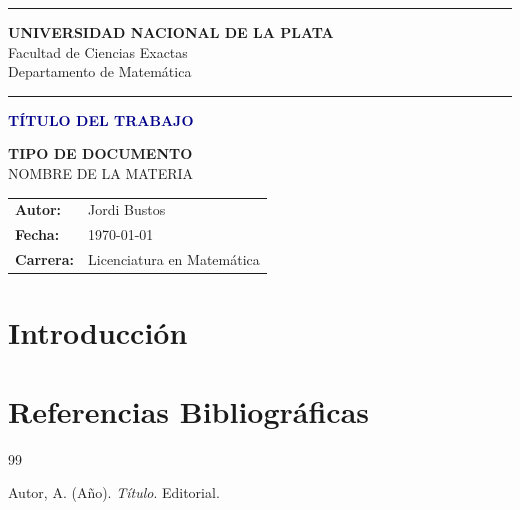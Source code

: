 \documentclass[12pt,a4paper]{article}
\theoremstyle{profesional}
\theoremstyle{definicion-style}
\begin{document}
\thispagestyle{empty}
\begin{center}
    \vspace*{1cm}

    \textcolor{darkblue}{\rule{\linewidth}{2pt}}

    \vspace{0.5cm}
    {\large \textbf{UNIVERSIDAD NACIONAL DE LA PLATA}}\\
    {\normalsize Facultad de Ciencias Exactas}\\
    {\normalsize Departamento de Matemática}\\

    \vspace{0.5cm}
    \textcolor{darkblue}{\rule{\linewidth}{2pt}}

    \vspace{2.5cm}

    {\Huge \textbf{\textcolor{darkblue}{TÍTULO DEL TRABAJO}}}\\

    \vspace{3cm}

    {\large \textbf{TIPO DE DOCUMENTO}}\\   %
    {\normalsize NOMBRE DE LA MATERIA}

    \vspace{2.5cm}

    {\normalsize
        \begin{tabular}{ll}
            \textbf{Autor:}   & Jordi Bustos               \\
            \textbf{Fecha:}   & \today                     \\
            \textbf{Carrera:} & Licenciatura en Matemática
        \end{tabular}
    }

    \vfill

    \vspace{1cm}
\end{center}

\newpage

\tableofcontents
\thispagestyle{empty}
\newpage

\section{Introducción}

\newpage

\section*{Referencias Bibliográficas}

\begin{thebibliography}{99}

     Autor, A. (Año). \textit{Título}. Editorial.

\end{thebibliography}
\end{document}
